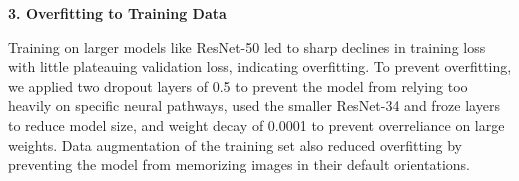 \documentclass{article} %
\begin{document}
\textbf{3. Overfitting to Training Data}

Training on larger models like ResNet-50 led to sharp declines in training loss with little plateauing validation loss, indicating overfitting. To prevent overfitting, we applied two dropout layers of 0.5 to prevent the model from relying too heavily on specific neural pathways, used the smaller ResNet-34 and froze layers to reduce model size, and weight decay of 0.0001 to prevent overreliance on large weights. Data augmentation of the training set also reduced overfitting by preventing the model from memorizing images in their default orientations.

\label{last_page}
\pagebreak



\end{document}
